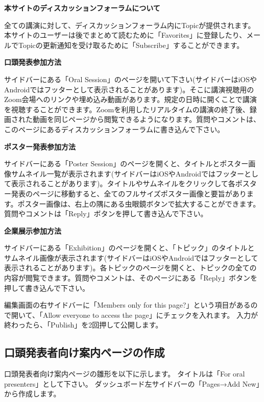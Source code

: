 \documentclass[titlepage,10pt,a4paper,uplatex]{jsbook}
\newenvironment{content}{\begin{shaded}\vspace{-1em}\raggedright\ttfamily\footnotesize\setlength{\baselineskip}{1.4em}}{\end{shaded}\vspace{-1em}}
\renewcommand{\textbf}[1]{{\bfseries\sffamily#1}}
\begin{document}
\begin{content}
\textbf{\Large 本サイトのディスカッションフォーラムについて}

全ての講演に対して、ディスカッションフォーラム内にTopicが提供されます。本サイトのユーザーは後でまとめて読むために「Favorites」に登録したり、メールでTopicの更新通知を受け取るために「Subscribe」することができます。

\textbf{\Large 口頭発表参加方法}

サイドバーにある「Oral Session」のページを開いて下さい(サイドバーはiOSやAndroidではフッターとして表示されることがあります)。そこに講演視聴用のZoom会場へのリンクや埋め込み動画があります。規定の日時に開くことで講演を視聴することができます。Zoomを利用したリアルタイムの講演の終了後、録画された動画を同じページから閲覧できるようになります。質問やコメントは、このページにあるディスカッションフォーラムに書き込んで下さい。

\textbf{\Large ポスター発表参加方法}

サイドバーにある「Poster Session」のページを開くと、タイトルとポスター画像サムネイル一覧が表示されます(サイドバーはiOSやAndroidではフッターとして表示されることがあります)。タイトルやサムネイルをクリックして各ポスター発表のページに移動すると、全てのフルサイズポスター画像と要旨があります。ポスター画像は、右上の隅にある虫眼鏡ボタンで拡大することができます。質問やコメントは「Reply」ボタンを押して書き込んで下さい。

\textbf{\Large 企業展示参加方法}

サイドバーにある「Exhibition」のページを開くと、「トピック」のタイトルとサムネイル画像が表示されます(サイドバーはiOSやAndroidではフッターとして表示されることがあります)。各トピックのページを開くと、トピックの全ての内容が閲覧できます。質問やコメントは、そのページにある「Reply」ボタンを押して書き込んで下さい。
\end{content}

編集画面の右サイドバーに「Members only for this page?」という項目があるので開いて、「Allow everyone to access the page」にチェックを入れます。
入力が終わったら、「Publish」を2回押して公開します。

\subsection{口頭発表者向け案内ページの作成}

口頭発表者向け案内ページの雛形を以下に示します。
タイトルは「For oral presenters」として下さい。
ダッシュボード左サイドバーの「Pages→Add New」から作成します。
\end{document}
